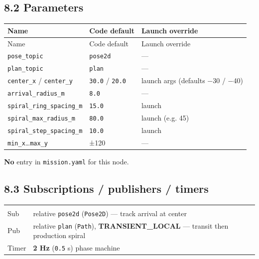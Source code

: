 \subsection{8.2 Parameters}


\begin{center}
\small
\begin{longtable}{@{}llp{7.2cm}@{}}
\toprule
Name & Code default & Launch override \\
\midrule
\endfirsthead
\toprule
Name & Code default & Launch override \\
\midrule
\endhead
\texttt{pose\_topic} & \texttt{pose2d} & --- \\
\texttt{plan\_topic} & \texttt{plan} & --- \\
\texttt{center\_x} / \texttt{center\_y} & \texttt{30.0} / \texttt{20.0} & launch args (defaults −30 / −40) \\
\texttt{arrival\_radius\_m} & \texttt{8.0} & --- \\
\texttt{spiral\_ring\_spacing\_m} & \texttt{15.0} & launch \\
\texttt{spiral\_max\_radius\_m} & \texttt{80.0} & launch (e.g. 45) \\
\texttt{spiral\_step\_spacing\_m} & \texttt{10.0} & launch \\
\texttt{min\_x}…\texttt{max\_y} & ±120 & --- \\
\bottomrule
\end{longtable}
\end{center}


\textbf{No} entry in \texttt{mission.yaml} for this node.


\subsection{8.3 Subscriptions / publishers / timers}


\begin{center}
\small
\begin{longtable}{@{}lp{10cm}@{}}
\toprule
 &  \\
\midrule
\endfirsthead
\toprule
 &  \\
\midrule
\endhead
Sub & relative \texttt{pose2d} (\texttt{Pose2D}) --- track arrival at center \\
Pub & relative \texttt{plan} (\texttt{Path}), \textbf{TRANSIENT\_LOCAL} --- transit then production spiral \\
Timer & \textbf{2 Hz} (\texttt{0.5} s) phase machine \\
\bottomrule
\end{longtable}
\end{center}


